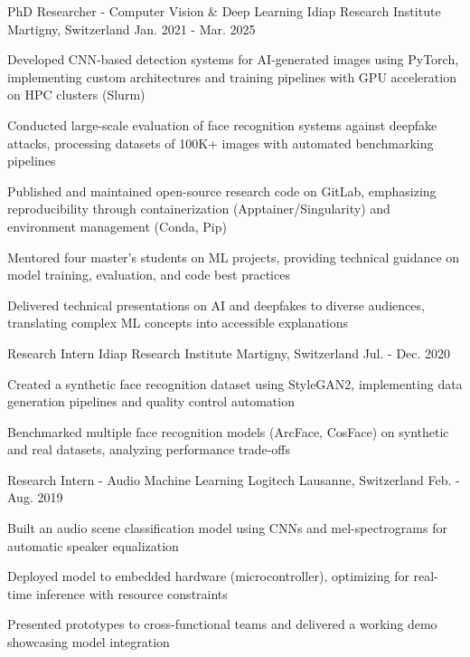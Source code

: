 \begin{cventries}
  \cventry
    {PhD Researcher - Computer Vision \& Deep Learning} %
    {Idiap Research Institute} %
    {Martigny, Switzerland} %
    {Jan. 2021 - Mar. 2025} %
    {
      \begin{cvitems} %
        \item {Developed CNN-based detection systems for AI-generated images using PyTorch, implementing custom architectures and training pipelines with GPU acceleration on HPC clusters (Slurm)}
        \item {Conducted large-scale evaluation of face recognition systems against deepfake attacks, processing datasets of 100K+ images with automated benchmarking pipelines}
        \item {Published and maintained open-source research code on GitLab, emphasizing reproducibility through containerization (Apptainer/Singularity) and environment management (Conda, Pip)}
        \item {Mentored four master's students on ML projects, providing technical guidance on model training, evaluation, and code best practices}
        \item {Delivered technical presentations on AI and deepfakes to diverse audiences, translating complex ML concepts into accessible explanations}
      \end{cvitems}
    }

  \cventry
    {Research Intern} %
    {Idiap Research Institute} %
    {Martigny, Switzerland} %
    {Jul. - Dec. 2020} %
    {
      \begin{cvitems} %
        \item {Created a synthetic face recognition dataset using StyleGAN2, implementing data generation pipelines and quality control automation}
        \item {Benchmarked multiple face recognition models (ArcFace, CosFace) on synthetic and real datasets, analyzing performance trade-offs}
      \end{cvitems}
    }

  \cventry
    {Research Intern - Audio Machine Learning} %
    {Logitech} %
    {Lausanne, Switzerland} %
    {Feb. - Aug. 2019} %
    {
      \begin{cvitems} %
        \item {Built an audio scene classification model using CNNs and mel-spectrograms for automatic speaker equalization}
        \item {Deployed model to embedded hardware (microcontroller), optimizing for real-time inference with resource constraints}
        \item {Presented prototypes to cross-functional teams and delivered a working demo showcasing model integration}
      \end{cvitems}
    }

\end{cventries}
